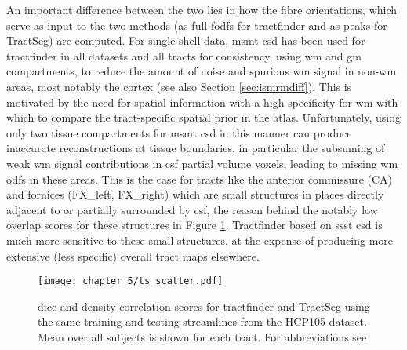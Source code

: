 An important difference between the two lies in how the fibre orientations, which serve as input to the two methods (as full \glspl{fodf} for tractfinder and as peaks for TractSeg) are computed.
For single shell data, \gls{msmt} \gls{csd} has been used for tractfinder in all datasets and all tracts for consistency, using \gls{wm} and \gls{gm} compartments, to reduce the amount of noise and spurious \gls{wm} signal in non-\gls{wm} areas, most notably the cortex (see also Section \ref{sec:ismrmdiff}).
This is motivated by the need for spatial information with a high specificity for \gls{wm} with which to compare the tract-specific spatial prior in the atlas.
Unfortunately, using only two tissue compartments for \gls{msmt} \gls{csd} in this manner can produce inaccurate reconstructions at tissue boundaries, in particular the subsuming of weak \gls{wm} signal contributions in \gls{csf} partial volume voxels, leading to missing \gls{wm} \glspl{odf} in these areas.
This is the case for tracts like the anterior commissure (CA) and fornices (FX\_left, FX\_right) which are small structures in places directly adjacent to or partially surrounded by \gls{csf}, the reason behind the notably low overlap scores for these structures in Figure \ref{fig:ts_all_tracts}.
Tractfinder based on \gls{ssst} \gls{csd} is much more sensitive to these small structures, at the expense of producing more extensive (less specific) overall tract maps elsewhere.

\begin{figure}[h!]
  \texttt{[image: chapter\_5/ts\_scatter.pdf]}
  \caption[Direct comparison between tractfinder and TractSeg, in all tracts]{\Gls{dice} and density correlation scores for tractfinder and TractSeg using the same training and testing streamlines from the HCP105 dataset. Mean over all subjects is shown for each tract. For abbreviations see \textcite{Wasserthal2018}}
  \label{fig:ts_all_tracts}
\end{figure}

